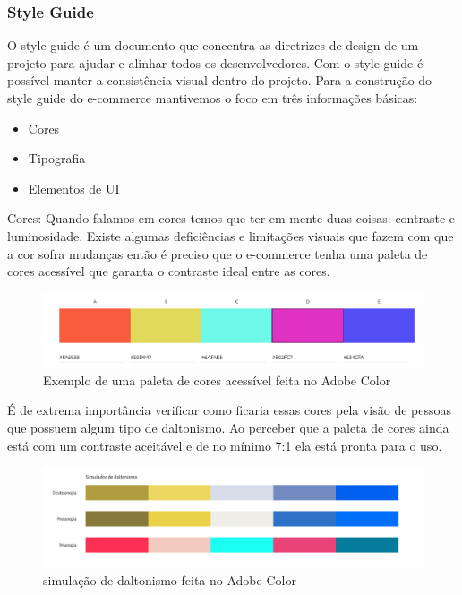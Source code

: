 \newpage
\subsubsection{Style Guide}
{O style guide é um documento que concentra as diretrizes de design de um projeto para ajudar e alinhar todos os desenvolvedores. Com o style guide é possível manter a consistência visual dentro do projeto. Para a construção do style guide do e-commerce mantivemos o foco em três informações básicas:
\begin{itemize}
\item Cores
\item Tipografia
\item Elementos de UI
\end{itemize}

\vspace*{20px}
Cores:  Quando falamos em cores temos que ter em mente duas coisas: contraste e luminosidade. Existe algumas deficiências e limitações visuais que fazem com que a cor sofra mudanças então é preciso que o e-commerce tenha uma paleta de cores acessível que garanta o contraste ideal entre as cores. 
\begin{figure}[ht]
  		\centering
        \includegraphics[width=1.0\textwidth]{images/paleta_de_cores_acessiveis.png}
        \caption{Exemplo de uma paleta de cores acessível feita no Adobe Color}
\end{figure}  
 
\vspace*{50px}
É de extrema importância verificar como ficaria essas cores pela visão de pessoas que possuem algum tipo de daltonismo. Ao perceber que a paleta de cores ainda está com um contraste aceitável e de no mínimo 7:1 ela está pronta para o uso. 
 \begin{figure}[ht]
        \centering
    	\includegraphics[width=1.0\textwidth]{images/paleta_daltonismo.png}
        \caption{simulação de daltonismo feita no Adobe Color}
\end{figure}  


}
